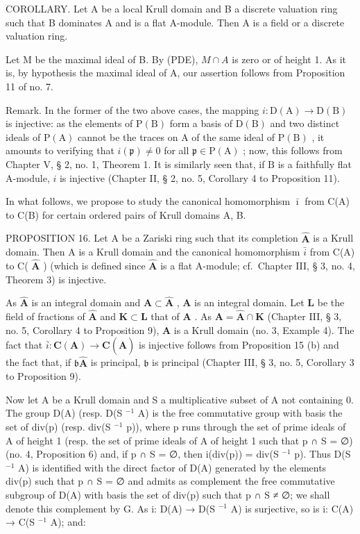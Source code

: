 COROLLARY. Let A be a local Krull domain and B a discrete valuation ring such that B dominates A and is a flat A-module. Then A is a field or a discrete valuation ring.

Let M be the maximal ideal of B. By (PDE), \(M \cap A\) is zero or of height 1. As it is, by hypothesis the maximal ideal of A, our assertion follows from Proposition 11 of no. 7.

Remark. In the former of the two above cases, the mapping \(i\colon\mathrm{D}(\mathrm{A})\to\mathrm{D}(\mathrm{B})\) is injective: as the elements of \(\mathrm{P}(\mathrm{B})\) form a basis of \(\mathrm{D}(\mathrm{B})\) and two distinct ideals of \(\mathrm{P}(\mathrm{A})\) cannot be the traces on \(\mathrm{A}\) of the same ideal of \(\mathrm{P}(\mathrm{B})\) , it amounts to verifying that \(i(\mathfrak{p})\neq0\) for all \(\mathfrak{p}\in\mathrm{P}(\mathrm{A})\) ; now, this follows from Chapter V, § 2, no. 1, Theorem 1. It is similarly seen that, if \(\mathrm{B}\) is a faithfully flat A-module, \(i\) is injective (Chapter II, § 2, no. 5, Corollary 4 to Proposition 11).

In what follows, we propose to study the canonical homomorphism \(\bar{\imath}\) from C(A) to C(B) for certain ordered pairs of Krull domains A, B.

PROPOSITION 16. Let A be a Zariski ring such that its completion \(\hat{\mathbf{A}}\) is a Krull domain. Then A is a Krull domain and the canonical homomorphism \(\bar{i}\) from C(A) to C( \(\hat{\mathbf{A}}\) ) (which is defined since \(\hat{\mathbf{A}}\) is a flat A-module; cf.~Chapter III, § 3, no. 4, Theorem 3) is injective.

As \(\hat{\mathbf{A}}\) is an integral domain and \(\mathbf{A} \subset \hat{\mathbf{A}}\) , \(\mathbf{A}\) is an integral domain. Let \(\mathbf{L}\) be the field of fractions of \(\hat{\mathbf{A}}\) and \(\mathbf{K} \subset \mathbf{L}\) that of \(\mathbf{A}\) . As \(\mathbf{A} = \hat{\mathbf{A}} \cap \mathbf{K}\) (Chapter III, § 3, no. 5, Corollary 4 to Proposition 9), \(\mathbf{A}\) is a Krull domain (no. 3, Example 4). The fact that \(\bar{i}: \mathbf{C}(\mathbf{A}) \to \mathbf{C}(\hat{\mathbf{A}})\) is injective follows from Proposition 15 (b) and the fact that, if \(\mathfrak{b}\hat{\mathbf{A}}\) is principal, \(\mathfrak{b}\) is principal (Chapter III, § 3, no. 5, Corollary 3 to Proposition 9).

Now let A be a Krull domain and S a multiplicative subset of A not containing 0. The group D(A) (resp. D(S \(^{-1}\) A) is the free commutative group with basis the set of div(p) (resp. div(S \(^{-1}\) p)), where p runs through the set of prime ideals of A of height 1 (resp. the set of prime ideals of A of height 1 such that p ∩ S = ∅) (no. 4, Proposition 6) and, if p ∩ S = ∅, then i(div(p)) = div(S \(^{-1}\) p). Thus D(S \(^{-1}\) A) is identified with the direct factor of D(A) generated by the elements div(p) such that p ∩ S = ∅ and admits as complement the free commutative subgroup of D(A) with basis the set of div(p) such that p ∩ S ≠ ∅; we shall denote this complement by G. As i: D(A) → D(S \(^{-1}\) A) is surjective, so is i: C(A) → C(S \(^{-1}\) A); and:

